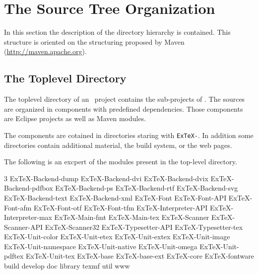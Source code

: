 \chapter{The Source Tree Organization}

In this section the description of the directory hierarchy is
contained. This structure is oriented on the structuring proposed by
Maven (\url{http://maven.apache.org}).


\section{The Toplevel Directory}

The toplevel directory of an \ExTeX\ project contains the sub-projects
of \ExTeX. The sources are organized in components with predefined
dependencies. Those components are Eclipse projects as well as Maven
modules.

The components are cotained in directories staring with
\texttt{ExTeX-}. In addition some directories contain additional
material, the build system, or the web pages.

The following is an excpert of the modules present in the top-level
directory.

{
\begin{multicols}3 \footnotesize\sf\obeylines
  ExTeX-Backend-dump
  ExTeX-Backend-dvi
  ExTeX-Backend-dvix
  ExTeX-Backend-pdfbox
  ExTeX-Backend-ps
  ExTeX-Backend-rtf
  ExTeX-Backend-svg
  ExTeX-Backend-text
  ExTeX-Backend-xml
  ExTeX-Font
  ExTeX-Font-API
  ExTeX-Font-afm
  ExTeX-Font-otf
  ExTeX-Font-tfm
  ExTeX-Interpreter-API
  ExTeX-Interpreter-max
  ExTeX-Main-fmt
  ExTeX-Main-tex
  ExTeX-Scanner
  ExTeX-Scanner-API
  ExTeX-Scanner32
  ExTeX-Typesetter-API
  ExTeX-Typesetter-tex
  ExTeX-Unit-color
  ExTeX-Unit-etex
  ExTeX-Unit-extex
  ExTeX-Unit-image
  ExTeX-Unit-namespace
  ExTeX-Unit-native
  ExTeX-Unit-omega
  ExTeX-Unit-pdftex
  ExTeX-Unit-tex
  ExTeX-base
  ExTeX-base-ext
  ExTeX-core
  ExTeX-fontware
  build
  develop
  doc
  library
  texmf
  util
  www
\end{multicols}
}


